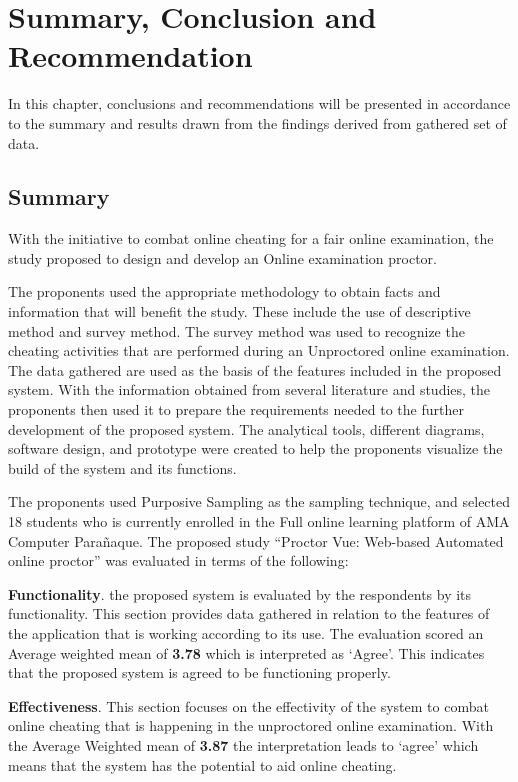 \chapter{Summary, Conclusion and Recommendation}

In this chapter, conclusions and recommendations will be presented in accordance to the summary and results drawn from the findings derived from gathered set of data.

\section{Summary}

With the initiative to combat online cheating for a fair online examination, the study proposed to design and develop an Online examination proctor.

The proponents used the appropriate methodology to obtain facts and information that will benefit the study.
These include the use of descriptive method and survey method.
The survey method was used to recognize the cheating activities that are performed during an Unproctored online examination.
The data gathered are used as the basis of the features included in the proposed system.
With the information obtained from several literature and studies, the proponents then used it to prepare the requirements needed to the further development of the proposed system.
The analytical tools, different diagrams, software design, and prototype were created to help the proponents visualize the build of the system and its functions.

The proponents used Purposive Sampling as the sampling technique, and selected 18 students who is currently enrolled in the Full online learning platform of AMA Computer Parañaque.
The proposed study “Proctor Vue: Web-based Automated online proctor” was evaluated in terms of the following:

\textbf{Functionality}.
the proposed system is evaluated by the respondents by its functionality.
This section provides data gathered in relation to the features of the application that is working according to its use.
The evaluation scored an Average weighted mean of \textbf{3.78} which is interpreted as ‘Agree’.
This indicates that the proposed system is agreed to be functioning properly.

\textbf{Effectiveness}.
This section focuses on the effectivity of the system to combat online cheating that is happening in the unproctored online examination.
With the Average Weighted mean of \textbf{3.87} the interpretation leads to ‘agree’ which means that the system has the potential to aid online cheating.

